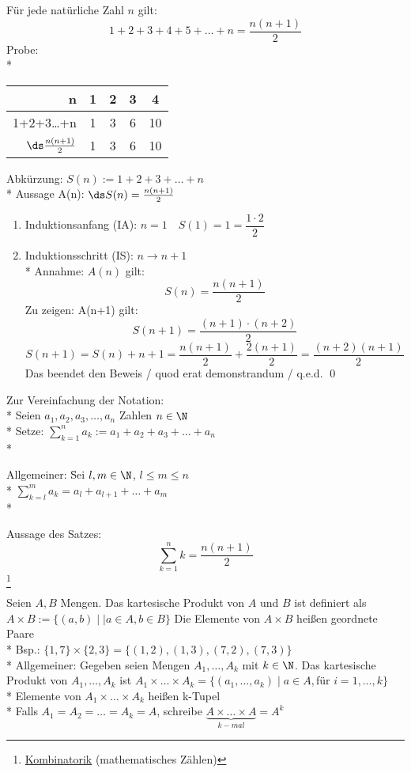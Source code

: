 Für jede natürliche Zahl $n$ gilt:
$$1+2+3+4+5+…+n=\frac{n(n+1)}{2}$$
Probe:\\*
\begin{tabular}{r|c|c|c|c}
n & 1 & 2 & 3 & 4\\* \hline\hline
1+2+3…+n & 1 & 3 & 6 & 10\\* \hline
$\ds \frac{n(n+1)}{2}$ & 1 & 3 & 6 & 10\\*
\end{tabular}
Abkürzung: $S(n) := 1+2+3+…+n$\\*
Aussage A(n): $\ds S(n) = \frac{n(n+1)}{2}$
\begin{enumerate}
\item {Induktionsanfang (IA): $n=1\quad S(1) = 1 = \dfrac{1·2}{2}$\ok}
\item {Induktionsschritt (IS): $n → n+1$\\*
Annahme: $A(n)$ gilt: $$ S(n) = \frac{n(n+1)}{2}$$
Zu zeigen: A(n+1) gilt: $$S(n+1)=\frac{(n+1)·(n+2)}{2}$$
$$S(n+1)=S(n)+n+1=\frac{n(n+1)}{2}+\frac{2(n+1)}{2}=\frac{(n+2)(n+1)}{2}$$
Das beendet den Beweis / quod erat demonstrandum / q.e.d.} \qed
\end{enumerate}
%
Zur Vereinfachung der Notation:\\*
Seien $a_1,a_2,a_3,…,a_n$ Zahlen $n \in \N$\\*
Setze: $\sum_{k=1}^n a_k := a_1+a_2+a_3+…+a_n$\\*
\begin{tabbing}
Allgemeiner: \=Sei $l,m \in \N$, $l \le m \le n$\\*
\>$\sum_{k=l}^m a_k = a_l+a_{l+1}+…+a_m$\\*
\end{tabbing}
Aussage des Satzes:
\[ \sum_{k=1}^n k = \frac{n(n+1)}{2}\]\footnote{\ul{Kombinatorik} (mathematisches Zählen)}

Seien $A, B$ Mengen. Das kartesische Produkt von $A$ und $B$ ist definiert als $A × B := \{(a,b)\mid |a\in A, b \in B\}$ Die Elemente von $A × B$ heißen geordnete Paare\\*
Bsp.: $\{1,7\}\times \{2,3\}=\{(1,2),(1,3),(7,2),(7,3)\}$\\*
Allgemeiner: Gegeben seien Mengen
$A_1,…,A_k$ mit $k \in \N$. Das kartesische Produkt von $A_1,…,A_k$ ist $A_1\times …\times A_k = \{(a_1,…,a_k)\mid a\in A, $für $i=1,…,k\}$\\*
Elemente von $A_1 × … × A_k$ heißen k-Tupel\\*
Falls $A_1=A_2=…=A_k=A$, schreibe $\underbrace{A×…×A}_{k-mal}=A^k$

